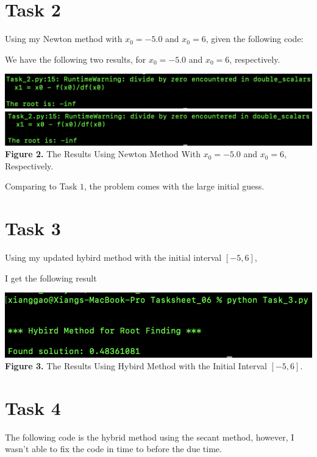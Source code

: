 \documentclass{article}
\begin{document}
\section*{Task 2}
Using my Newton method with $x_0 = -5.0$ and $x_0 = 6$, given the following code:

We have the following two results, for $x_0 = -5.0$ and $x_0 = 6$, respectively.
\begin{center}
\includegraphics[width=\textwidth]{Screenshots/Task_2.1.png}
\includegraphics[width=\textwidth]{Screenshots/Task_2.2.png}\\
{\bf Figure 2.} The Results Using Newton Method With $x_0 = -5.0$ and $x_0 = 6$, Respectively.
\end{center}
Comparing to Task $1$, the problem comes with the large initial guess.

\section*{Task 3}
Using my updated hybird method with the initial interval $[-5, 6]$, 

I get the following result
\begin{center}
\includegraphics[width=\textwidth]{Screenshots/Task_3.png}
{\bf Figure 3.} The Results Using Hybird Method with the Initial Interval $[-5, 6]$.
\end{center}

\section*{Task 4}
The following code is the hybrid method using the secant method, however, I wasn't able to fix the code in time to before the due time.

\end{document}
